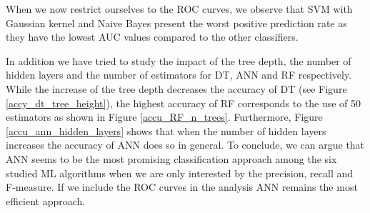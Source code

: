 When we now restrict ourselves to the ROC curves, we observe that SVM with Gaussian kernel and Naive Bayes present the worst positive prediction rate as they have the lowest AUC values compared to the other classifiers.

In addition we have tried to study the impact of the tree depth, the number of hidden layers and the number of estimators for DT, ANN and RF respectively. While the increase of the tree depth decreases the accuracy of DT (see Figure  \ref{accy_dt_tree_height}), the highest accuracy of RF corresponds to the use of 50 estimators as shown in Figure \ref{accu_RF_n_trees}. Furthermore, Figure \ref{accu_ann_hidden_layers} shows that when the number of hidden layers increases the accuracy of ANN does so in general.
To conclude, we can argue that ANN seems to be the most promising classification approach among the six studied ML algorithms when we are only interested by the precision, recall and F-measure. If we include the ROC curves in the analysis ANN remains the most efficient approach.

